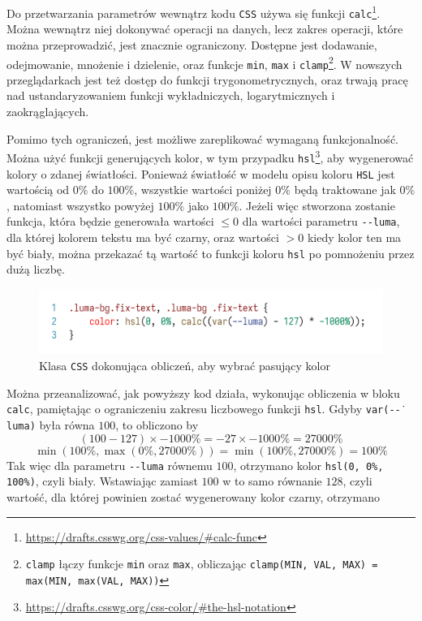 \documentclass[licencjacka]{pracadypl}
\begin{document}
Do przetwarzania parametrów wewnątrz kodu \texttt{CSS} używa się funkcji \texttt{calc}\footnote{\url{https://drafts.csswg.org/css-values/\#calc-func}}. Można wewnątrz niej dokonywać operacji na danych, lecz zakres operacji, które można przeprowadzić, jest znacznie ograniczony. Dostępne jest dodawanie, odejmowanie, mnożenie i dzielenie, oraz funkcje \texttt{min}, \texttt{max} i \texttt{clamp}\footnote{\texttt{clamp} łączy funkcje \texttt{min} oraz \texttt{max}, obliczając \texttt{clamp(MIN, VAL, MAX) = max(MIN, max(VAL, MAX))}}. W nowszych przeglądarkach jest też dostęp do funkcji trygonometrycznych, oraz trwają pracę nad ustandaryzowaniem funkcji wykładniczych, logarytmicznych i zaokrąglających.

Pomimo tych ograniczeń, jest możliwe zareplikować wymaganą funkcjonalność. Można użyć funkcji generujących kolor, w tym przypadku \texttt{hsl}\footnote{\url{https://drafts.csswg.org/css-color/\#the-hsl-notation}}, aby wygenerować kolory o zdanej światłości. Ponieważ światłość w modelu opisu koloru \texttt{HSL} jest wartością od $0\%$ do $100\%$, wszystkie wartości poniżej $0\%$ będą traktowane jak $0\%$, natomiast wszystko powyżej $100\%$ jako $100\%$. Jeżeli więc stworzona zostanie funkcja, która będzie generowała wartości $\leq 0$ dla wartości parametru \texttt{-\.-luma}, dla której kolorem tekstu ma być czarny, oraz wartości $> 0$ kiedy kolor ten ma być biały, można przekazać tą wartość to funkcji koloru \texttt{hsl} po pomnożeniu przez dużą liczbę.

\begin{figure}[H]
  \centering
  \includegraphics[width=\linewidth]{images/code-css-luma-calc.png}
  \caption{Klasa \texttt{CSS} dokonująca obliczeń, aby wybrać pasujący kolor}
  \label{fig:css-css-luma-calc}
\end{figure}

Można przeanalizować, jak powyższy kod działa, wykonując obliczenia w bloku \texttt{calc}, pamiętając o ograniczeniu zakresu liczbowego funkcji \texttt{hsl}. Gdyby \texttt{var(-\.-luma)} była równa $100$, to obliczono by
\[
  \left(100-127\right) \times -1000\% = -27 \times -1000\% = 27000\%
\]
\[
  \min\left(100\%, \max\left(0\%, 27000\%\right)\right) = \min\left(100\%, 27000\%\right) = 100\%
\]
Tak więc dla parametru \texttt{-\.-luma} równemu $100$, otrzymano kolor \texttt{hsl(0, 0\%, 100\%)}, czyli biały. Wstawiając zamiast $100$ w to samo równanie $128$, czyli wartość, dla której powinien zostać wygenerowany kolor czarny, otrzymano
\end{document}
